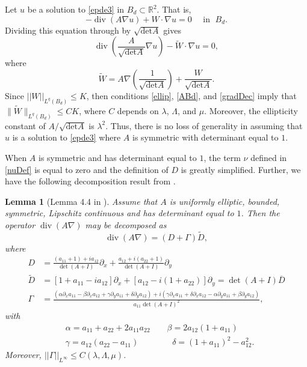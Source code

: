 \documentclass[12pt,reqno]{amsart}
\theoremstyle{plain}
\newtheorem{lem}{Lemma}
\theoremstyle{definition}
\DeclareMathOperator{\di}{div}
\newcommand{\al}{\alpha}
\newcommand{\be}{\beta}
\newcommand{\ga}{\gamma}
\newcommand{\de}{\delta}
\newcommand{\Ga}{\Gamma}
\newcommand{\la}{\lambda}
\newcommand{\La}{\Lambda}
\newcommand{\iny}{\infty}
\newcommand{\del}{ \partial}
\newcommand{\su}{\subset}
\newcommand{\gr}{\nabla}
\newcommand{\norm}[1]{\left\vert \left\vert #1\right\vert\right\vert}
\newcommand{\brac}[1]{\left[#1\right]}
\newcommand{\pr}[1]{\left( #1 \right) }
\newcommand{\R}{\ensuremath{\mathbb{R}}}
\begin{document}
Let $u$ be a solution to \eqref{epde3} in $B_d \su \R^2$.
That is,
$$- \di\pr{A \gr u} + W \cdot \gr u = 0 \quad \text{ in } \; B_d.$$
Dividing this equation through by $\sqrt{\mbox{det} A}$ gives
\begin{equation*}
\di\pr{\frac{A}{\sqrt{\mbox{det}A}}\gr u}-\widetilde{W}\cdot\gr u=0,
\end{equation*}
where
\begin{equation}\label{WW}
\widetilde W=A\gr\left(\frac{1}{\sqrt{\mbox{det}A}}\right)+\frac{W}{\sqrt{\mbox{det}A}}.
\end{equation}
Since $\norm{W}_{L^q\pr{B_d}} \le K$, then conditions \eqref{ellip}, \eqref{ABd}, and \eqref{gradDec} imply that $\|\widetilde W\|_{L^q\pr{B_d}} \le C K$, where $C$ depends on $\la$, $\La$, and $\mu$.
Moreover, the ellipticity constant of $A/\sqrt{\mbox{det}A}$ is $\lambda^2$.
Thus, there is no loss of generality in assuming that $u$ is a solution to \eqref{epde3} where $A$ is symmetric with determinant equal to $1$.

When $A$ is symmetric and has determinant equal to $1$, the term $\nu$ defined in \eqref{nuDef} is equal to zero and the definition of $D$ is greatly simplified.
Further, we have the following decomposition result from \cite{DKW17}.

\begin{lem}[Lemma 4.4 in \cite{DKW17}]
Assume that $A$ is uniformly elliptic, bounded, symmetric, Lipschitz continuous and has determinant equal to $1$.
Then the operator $\di\pr{A \gr}$ may be decomposed as
$$\di\pr{A \gr} = \pr{D + \Ga} \widetilde D,$$
where
\begin{align*}
D &= \frac{\pr{a_{11}  + 1} + i a_{12}}{\det\pr{A + I}} \del_x + \frac{  a_{12} + i \pr{a_{22} + 1}}{\det\pr{A + I}}  \del_y \\
\widetilde D &= \brac{1 + a_{11} - i a_{12}} \del_x + \brac{a_{12} - i\pr{1+a_{22}}} \del_y 
= \det\pr{A+I} \overline D  \\
\Ga 
&= \frac{\pr{\al \del_x a_{11} - \be \del_x a_{12} + \ga \del_y a_{11} + \de \del_y a_{12}} + i \pr{\ga \del_x a_{11} + \de \del_x a_{12} - \al \del_y a_{11} + \be \del_y a_{12}}}{ a_{11} \det\pr{A+I}^2},
\end{align*}
with 
\begin{align*}
&\al = a_{11} + a_{22} + 2 a_{11}a_{22} \qquad
\be = 2 a_{12}\pr{1 + a_{11}} \\
&\ga = a_{12}\pr{a_{22} - a_{11}} \qquad\qquad
\de = \pr{1 + a_{11}}^2 - a_{12}^2.
\end{align*}
Moreover, $\norm{\Ga}_{L^\iny} \le C\pr{\la, \La, \mu}$.
\label{decompLem}
\end{lem}
\end{document}

